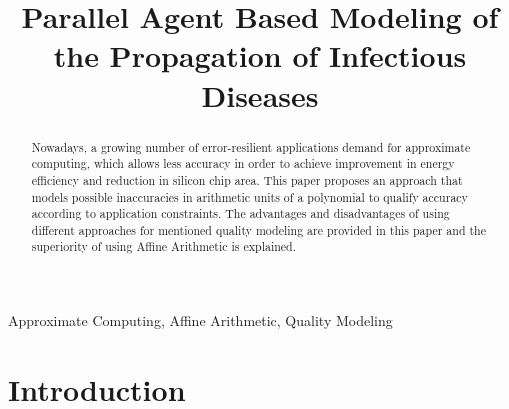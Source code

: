 \documentclass[conference]{IEEEtran}
\begin{document}
\title{Parallel Agent Based Modeling of the Propagation of Infectious Diseases}


\author{
}


\maketitle

\begin{abstract}
Nowadays, a growing number of error-resilient applications demand for approximate computing, which allows less accuracy in order to achieve improvement in energy efficiency and reduction in silicon chip area. This paper proposes an approach that models possible inaccuracies in arithmetic units of a polynomial to qualify accuracy according to application constraints. The advantages and disadvantages of using different approaches for mentioned quality modeling are provided in this paper and the superiority of using Affine Arithmetic is explained.
\end{abstract}

\begin{IEEEkeywords}
Approximate Computing, Affine Arithmetic, Quality Modeling
\end{IEEEkeywords}

\IEEEpeerreviewmaketitle

\section{Introduction}
\end{document}
